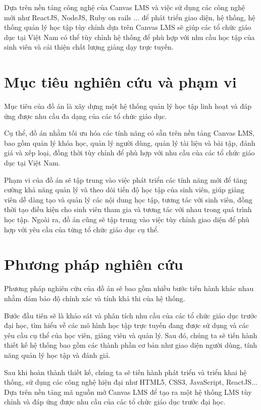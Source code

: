 \documentclass[../Thesis.tex]{subfiles}
\begin{document}
Dựa trên nền tảng công nghệ của Canvas LMS và việc sử dụng các công nghệ mới như ReactJS, NodeJS, Ruby on rails ... để phát triển giao diện, hệ thống, hệ thống quản lý học tập tùy chỉnh dựa trên Canvas LMS sẽ giúp các tổ chức giáo dục tại Việt Nam có thể tùy chỉnh hệ thống để phù hợp với nhu cầu học tập của sinh viên và cải thiện chất lượng giảng dạy trực tuyến.

\section{Mục tiêu nghiên cứu và phạm vi}

Mục tiêu của đồ án là xây dựng một hệ thống quản lý học tập linh hoạt và đáp ứng được nhu cầu đa dạng của các tổ chức giáo dục.

Cụ thể, đồ án nhằm tối ưu hóa các tính năng có sẵn trên nền tảng Canvas LMS, bao gồm quản lý khóa học, quản lý người dùng, quản lý tài liệu và bài tập, đánh giá và xếp loại, đồng thời tùy chỉnh để phù hợp với nhu cầu của các tổ chức giáo dục tại Việt Nam.

Phạm vi của đồ án sẽ tập trung vào việc phát triển các tính năng mới để tăng cường khả năng quản lý và theo dõi tiến độ học tập của sinh viên, giúp giảng viên dễ dàng tạo và quản lý các nội dung học tập, tương tác với sinh viên, đồng thời tạo điều kiện cho sinh viên tham gia và tương tác với nhau trong quá trình học tập. Ngoài ra, đồ án cũng sẽ tập trung vào việc tùy chỉnh giao diện để phù hợp với yêu cầu của từng tổ chức giáo dục cụ thể.
\section{Phương pháp nghiên cứu}
Phương pháp nghiên cứu của đồ án sẽ bao gồm nhiều bước tiến hành khác nhau nhằm đảm bảo độ chính xác và tính khả thi của hệ thống.

Bước đầu tiên sẽ là khảo sát và phân tích nhu cầu của các tổ chức giáo dục trước đại học, tìm hiểu về các mô hình học tập trực tuyến đang được sử dụng và các yêu cầu cụ thể của học viên, giảng viên và quản lý. Sau đó, chúng ta sẽ tiến hành thiết kế hệ thống bao gồm các thành phần cơ bản như giao diện người dùng, tính năng quản lý học tập và đánh giá.

Sau khi hoàn thành thiết kế, chúng ta sẽ tiến hành phát triển và triển khai hệ thống, sử dụng các công nghệ hiện đại như HTML5, CSS3, JavaScript, ReactJS... Dựa trên nền tảng mã nguồn mở Canvas LMS để tạo ra một hệ thống LMS tùy chỉnh và đáp ứng được nhu cầu của các tổ chức giáo dục trước đại học.
\end{document}

